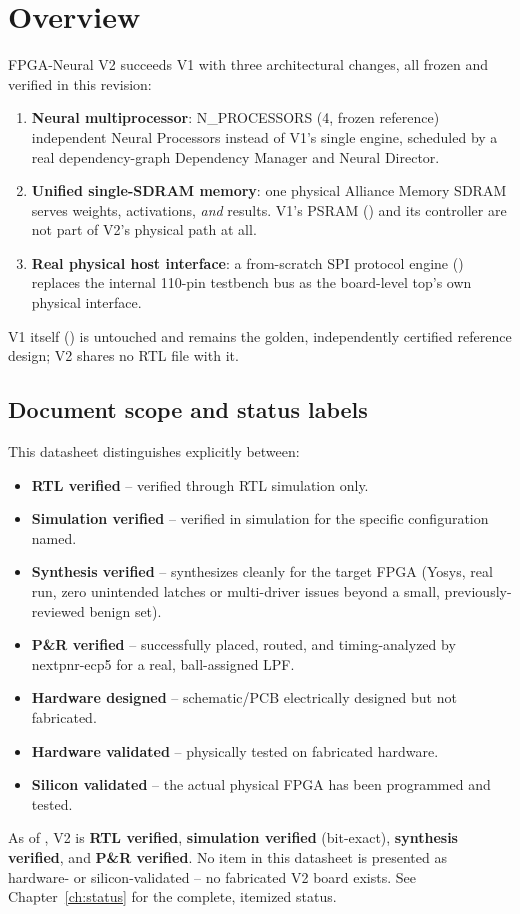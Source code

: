 \chapter{Overview}

FPGA-Neural V2 succeeds V1 with three architectural changes, all
frozen and verified in this revision:

\begin{enumerate}
\item \textbf{Neural multiprocessor}: N\_PROCESSORS (4, frozen
  reference) independent Neural Processors instead of V1's single
  engine, scheduled by a real dependency-graph Dependency Manager and
  Neural Director.
\item \textbf{Unified single-SDRAM memory}: one physical Alliance
  Memory  SDRAM serves weights, activations,
  \emph{and} results. V1's PSRAM () and
  its controller are not part of V2's physical path at all.
\item \textbf{Real physical host interface}: a from-scratch SPI
  protocol engine () replaces the internal
  110-pin  testbench bus as the board-level top's own
  physical interface.
\end{enumerate}

V1 itself () is untouched and remains the golden,
independently certified reference design; V2 shares no RTL file with
it.

\section{Document scope and status labels}
\label{sec:status-labels}
This datasheet distinguishes explicitly between:
\begin{itemize}
\item \textbf{RTL verified} -- verified through RTL simulation only.
\item \textbf{Simulation verified} -- verified in simulation for the
  specific configuration named.
\item \textbf{Synthesis verified} -- synthesizes cleanly for the
  target FPGA (Yosys, real run, zero unintended latches or
  multi-driver issues beyond a small, previously-reviewed benign set).
\item \textbf{P\&R verified} -- successfully placed, routed, and
  timing-analyzed by nextpnr-ecp5 for a real, ball-assigned LPF.
\item \textbf{Hardware designed} -- schematic/PCB electrically
  designed but not fabricated.
\item \textbf{Hardware validated} -- physically tested on fabricated
  hardware.
\item \textbf{Silicon validated} -- the actual physical FPGA has been
  programmed and tested.
\end{itemize}
As of \datasheetdate, V2 is \textbf{RTL verified}, \textbf{simulation
verified} (bit-exact), \textbf{synthesis verified}, and \textbf{P\&R
verified}. No item in this datasheet is presented as hardware- or
silicon-validated -- no fabricated V2 board exists. See
Chapter~\ref{ch:status} for the complete, itemized status.

